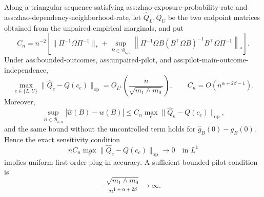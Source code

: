 Along a triangular sequence satisfying ass:zhao-exposure-probability-rate and ass:zhao-dependency-neighborhood-rate, let \(\widehat Q_L,\widehat Q_U\) be the two endpoint matrices obtained from the unpaired empirical marginals, and put
\[
C_n=n^{-2}\left[
\lVert\Pi^{-1}\Omega\Pi^{-1}\rVert_*
+\sup_{B\in\mathcal B_{\kappa,\overline a}}
\left\lVert\Pi^{-1}\Omega B(B^{\top}\Omega B)^{-1}B^{\top}\Omega\Pi^{-1}\right\rVert_*
\right].
\]
Under ass:bounded-outcomes, ass:unpaired-pilot, and ass:pilot-main-outcome-independence,
\[
\max_{e\in\{L,U\}}\lVert\widehat Q_e-Q(c_e)\rVert_{\mathrm{op}}
=O_{L^1}\!\left(\frac{n}{\sqrt{m_1\wedge m_0}}\right),
\qquad
C_n=O\!\left(n^{\alpha+2\beta-1}\right).
\]
Moreover,
\[
\sup_{B\in\mathcal B_{\kappa,\overline a}}
|\widehat w(B)-w(B)|
\le C_n\max_e\lVert\widehat Q_e-Q(c_e)\rVert_{\mathrm{op}},
\]
and the same bound without the uncontrolled term holds for \(\widehat g_B(0)-g_B(0)\).  Hence the exact sensitivity condition
\[
nC_n\max_e\lVert\widehat Q_e-Q(c_e)\rVert_{\mathrm{op}}
\longrightarrow0
\quad\text{in }L^1
\]
implies uniform first-order plug-in accuracy.  A sufficient bounded-pilot condition is
\[
\frac{\sqrt{m_1\wedge m_0}}{n^{1+\alpha+2\beta}}\longrightarrow\infty.
\]